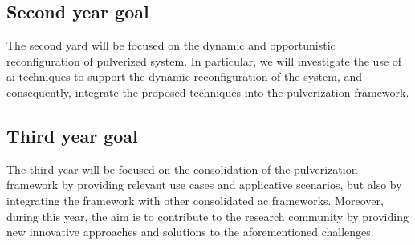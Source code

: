 \documentclass[12pt,a4paper]{article}
\begin{document}
\subsection{Second year goal}\label{subsec:second-year-activities}
The second yard will be focused on the dynamic and opportunistic reconfiguration of pulverized system.
%
In particular,
we will investigate the use of \ac{ai} techniques to support the dynamic reconfiguration of the system,
and consequently,
integrate the proposed techniques into the pulverization framework.

\subsection{Third year goal}\label{subsec:third-year-activities}
The third year will be focused on the consolidation of the pulverization framework by providing relevant use cases and applicative scenarios,
but also by integrating the framework with other consolidated \ac{ac} frameworks.
%
Moreover,
during this year,
the aim is to contribute to the research community by providing new innovative approaches and solutions to the aforementioned challenges.


\end{document}
